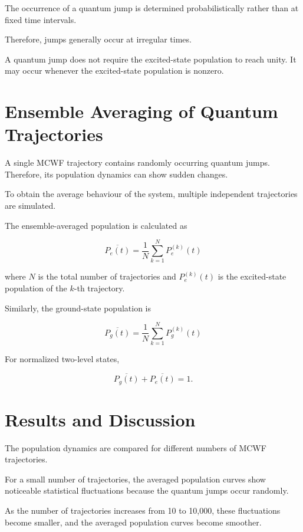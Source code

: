 \documentclass[12pt,a4paper]{report}
\begin{document}
The occurrence of a quantum jump is determined
probabilistically rather than at fixed time intervals.

Therefore, jumps generally occur at irregular times.

A quantum jump does not require the excited-state
population to reach unity. It may occur whenever
the excited-state population is nonzero.

\section{Ensemble Averaging of Quantum Trajectories}

A single MCWF trajectory contains randomly occurring
quantum jumps. Therefore, its population dynamics
can show sudden changes.

To obtain the average behaviour of the system,
multiple independent trajectories are simulated.

The ensemble-averaged population is calculated as

\begin{equation}
\boxed{
\overline{P_e(t)}
=
\frac{1}{N}
\sum_{k=1}^{N}P_e^{(k)}(t)
}
\end{equation}

where $N$ is the total number of trajectories and
$P_e^{(k)}(t)$ is the excited-state population of
the $k$-th trajectory.

Similarly, the ground-state population is

\begin{equation}
\boxed{
\overline{P_g(t)}
=
\frac{1}{N}
\sum_{k=1}^{N}P_g^{(k)}(t)
}
\end{equation}

For normalized two-level states,

\begin{equation}
\overline{P_g(t)}+\overline{P_e(t)}=1.
\end{equation}

\section{Results and Discussion}

The population dynamics are compared for different
numbers of MCWF trajectories.

For a small number of trajectories, the averaged
population curves show noticeable statistical
fluctuations because the quantum jumps occur randomly.

As the number of trajectories increases from 10 to
10,000, these fluctuations become smaller, and
the averaged population curves become smoother.
\end{document}
